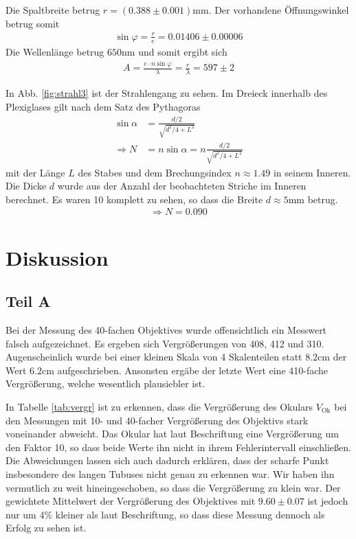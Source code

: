 \documentclass[12pt,a4paper,titlepage,headinclude,bibtotoc]{scrartcl}
\begin{document}
Die Spaltbreite betrug $r=(0.388\pm0.001)\si{\milli\metre}$.
Der vorhandene Öffnungswinkel betrug somit
\begin{align*}
\sin\varphi=\frac{r}{e}=0.01406 \pm 0.00006
\end{align*}
Die Wellenlänge betrug $650\si{\nano\metre}$ und somit ergibt sich
\begin{align*}
A=\frac{e\cdot n\sin\varphi}{\lambda}=\frac{r}{\lambda}=597 \pm 2
\end{align*}

In Abb. \ref{fig:strahl3} ist der Strahlengang zu sehen.
Im Dreieck innerhalb des Plexiglases gilt nach dem Satz des Pythagoras
\begin{align}
\sin\alpha&=\frac{d/2}{\sqrt{d^2/4+L^2}}\\
\Rightarrow N&=n\sin\alpha=n\frac{d/2}{\sqrt{d^2/4+L^2}}
\end{align}
mit der Länge $L$ des Stabes und dem Brechungsindex $n\approx1.49$ in seinem Inneren.
Die Dicke $d$ wurde aus der Anzahl der beobachteten Striche im Inneren berechnet.
Es waren 10 komplett zu sehen, so dass die Breite $d\approx 5\si{\milli\metre}$ betrug.
\begin{align*}
\Rightarrow N=0.090
\end{align*}

\section{Diskussion}
\label{sec:diskussion}
\subsection{Teil A}
Bei der Messung des 40-fachen Objektives wurde offensichtlich ein Messwert falsch aufgezeichnet.
Es ergeben sich Vergrößerungen von 408, 412 und 310.
Augenscheinlich wurde bei einer kleinen Skala von 4 Skalenteilen statt $8.2\si{\centi\metre}$ der Wert $6.2\si{\centi\metre}$ aufgeschrieben.
Ansonsten ergäbe der letzte Wert eine 410-fache Vergrößerung, welche wesentlich plausiebler ist.

In Tabelle \ref{tab:vergr} ist zu erkennen, dass die Vergrößerung des Okulars $V_\text{Ok}$ bei den Messungen mit 10- und 40-facher Vergrößerung des Objektivs stark voneinander abweicht.
Das Okular hat laut Beschriftung eine Vergrößerung um den Faktor 10, so dass beide Werte ihn nicht in ihrem Fehlerintervall einschließen.
Die Abweichungen lassen sich auch dadurch erklären, dass der scharfe Punkt insbesondere des langen Tubuses nicht genau zu erkennen war.
Wir haben ihn vermutlich zu weit hineingeschoben, so dass die Vergrößerung zu klein war.
Der gewichtete Mittelwert der Vergrößerung des Objektives mit $9.60\pm0.07$ ist jedoch nur um 4\% kleiner als laut Beschriftung, so dass diese Messung dennoch als Erfolg zu sehen ist.
\end{document}
